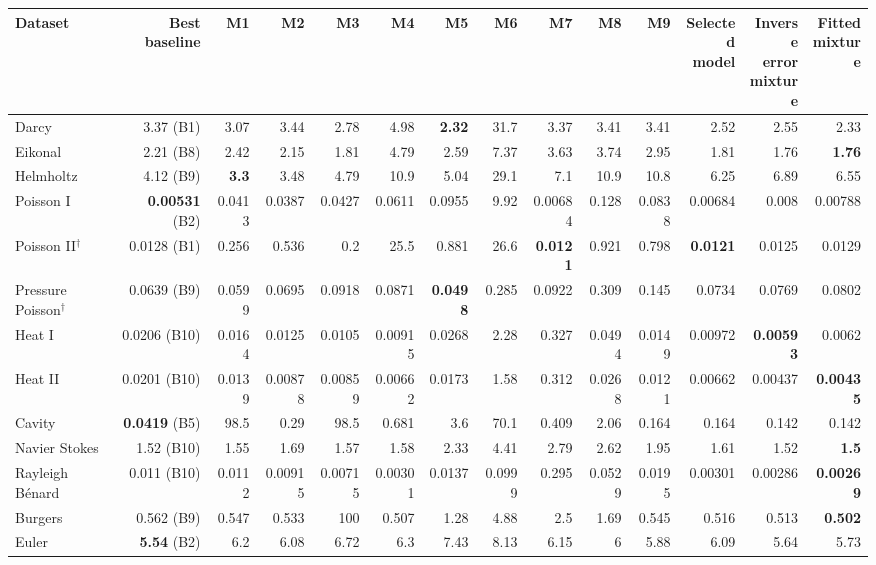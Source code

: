 \begin{tabular}{lr|rrrrrrrrr|rrr}
\toprule
Dataset & Best baseline & M1 & M2 & M3 & M4 & M5 & M6 & M7 & M8 & M9 & \shortstack[r]{Selected\\model} & \shortstack[r]{Inverse\\error\\mixture} & \shortstack[r]{Fitted\\mixture} \\
\midrule
Darcy & 3.37 (B1) & 3.07 & 3.44 & 2.78 & 4.98 & \textbf{2.32} & 31.7 & 3.37 & 3.41 & 3.41 & 2.52 & 2.55 & 2.33 \\
Eikonal & 2.21 (B8) & 2.42 & 2.15 & 1.81 & 4.79 & 2.59 & 7.37 & 3.63 & 3.74 & 2.95 & 1.81 & 1.76 & \textbf{1.76} \\
Helmholtz & 4.12 (B9) & \textbf{3.3} & 3.48 & 4.79 & 10.9 & 5.04 & 29.1 & 7.1 & 10.9 & 10.8 & 6.25 & 6.89 & 6.55 \\
Poisson I & \textbf{0.00531} (B2) & 0.0413 & 0.0387 & 0.0427 & 0.0611 & 0.0955 & 9.92 & 0.00684 & 0.128 & 0.0838 & 0.00684 & 0.008 & 0.00788 \\
Poisson II$^{\dagger}$ & 0.0128 (B1) & 0.256 & 0.536 & 0.2 & 25.5 & 0.881 & 26.6 & \textbf{0.0121} & 0.921 & 0.798 & \textbf{0.0121} & 0.0125 & 0.0129 \\
Pressure Poisson$^{\dagger}$ & 0.0639 (B9) & 0.0599 & 0.0695 & 0.0918 & 0.0871 & \textbf{0.0498} & 0.285 & 0.0922 & 0.309 & 0.145 & 0.0734 & 0.0769 & 0.0802 \\
Heat I & 0.0206 (B10) & 0.0164 & 0.0125 & 0.0105 & 0.00915 & 0.0268 & 2.28 & 0.327 & 0.0494 & 0.0149 & 0.00972 & \textbf{0.00593} & 0.0062 \\
Heat II & 0.0201 (B10) & 0.0139 & 0.00878 & 0.00859 & 0.00662 & 0.0173 & 1.58 & 0.312 & 0.0268 & 0.0121 & 0.00662 & 0.00437 & \textbf{0.00435} \\
Cavity & \textbf{0.0419} (B5) & 98.5 & 0.29 & 98.5 & 0.681 & 3.6 & 70.1 & 0.409 & 2.06 & 0.164 & 0.164 & 0.142 & 0.142 \\
Navier Stokes & 1.52 (B10) & 1.55 & 1.69 & 1.57 & 1.58 & 2.33 & 4.41 & 2.79 & 2.62 & 1.95 & 1.61 & 1.52 & \textbf{1.5} \\
Rayleigh Bénard & 0.011 (B10) & 0.0112 & 0.00915 & 0.00715 & 0.00301 & 0.0137 & 0.0999 & 0.295 & 0.0529 & 0.0195 & 0.00301 & 0.00286 & \textbf{0.00269} \\
Burgers & 0.562 (B9) & 0.547 & 0.533 & 100 & 0.507 & 1.28 & 4.88 & 2.5 & 1.69 & 0.545 & 0.516 & 0.513 & \textbf{0.502} \\
Euler & \textbf{5.54} (B2) & 6.2 & 6.08 & 6.72 & 6.3 & 7.43 & 8.13 & 6.15 & 6 & 5.88 & 6.09 & 5.64 & 5.73 \\

\end{tabular}
